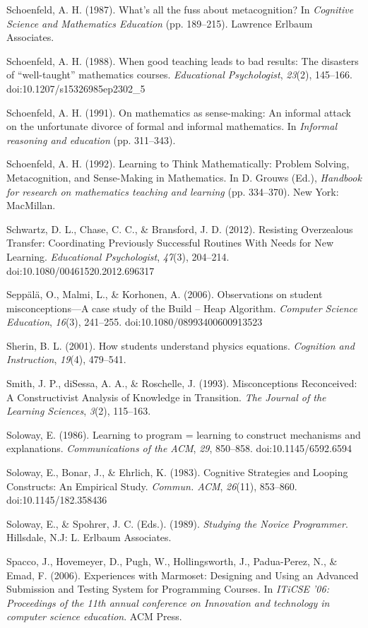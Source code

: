 Schoenfeld, A. H. (1987). What's all the fuss about metacognition? In
\emph{Cognitive Science and Mathematics Education} (pp. 189--215).
Lawrence Erlbaum Associates.

Schoenfeld, A. H. (1988). When good teaching leads to bad results: The
disasters of ``well-taught'' mathematics courses. \emph{Educational
Psychologist}, \emph{23}(2), 145--166. doi:10.1207/s15326985ep2302\_5

Schoenfeld, A. H. (1991). On mathematics as sense-making: An informal
attack on the unfortunate divorce of formal and informal mathematics. In
\emph{Informal reasoning and education} (pp. 311--343).

Schoenfeld, A. H. (1992). Learning to Think Mathematically: Problem
Solving, Metacognition, and Sense-Making in Mathematics. In D. Grouws
(Ed.), \emph{Handbook for research on mathematics teaching and learning}
(pp. 334--370). New York: MacMillan.

Schwartz, D. L., Chase, C. C., \& Bransford, J. D. (2012). Resisting
Overzealous Transfer: Coordinating Previously Successful Routines With
Needs for New Learning. \emph{Educational Psychologist}, \emph{47}(3),
204--214. doi:10.1080/00461520.2012.696317

Seppälä, O., Malmi, L., \& Korhonen, A. (2006). Observations on student
misconceptions---A case study of the Build -- Heap Algorithm.
\emph{Computer Science Education}, \emph{16}(3), 241--255.
doi:10.1080/08993400600913523

Sherin, B. L. (2001). How students understand physics equations.
\emph{Cognition and Instruction}, \emph{19}(4), 479--541.

Smith, J. P., diSessa, A. A., \& Roschelle, J. (1993). Misconceptions
Reconceived: A Constructivist Analysis of Knowledge in Transition.
\emph{The Journal of the Learning Sciences}, \emph{3}(2), 115--163.

Soloway, E. (1986). Learning to program = learning to construct
mechanisms and explanations. \emph{Communications of the ACM},
\emph{29}, 850--858. doi:10.1145/6592.6594

Soloway, E., Bonar, J., \& Ehrlich, K. (1983). Cognitive Strategies and
Looping Constructs: An Empirical Study. \emph{Commun. ACM},
\emph{26}(11), 853--860. doi:10.1145/182.358436

Soloway, E., \& Spohrer, J. C. (Eds.). (1989). \emph{Studying the Novice
Programmer}. Hillsdale, N.J: L. Erlbaum Associates.

Spacco, J., Hovemeyer, D., Pugh, W., Hollingsworth, J., Padua-Perez, N.,
\& Emad, F. (2006). Experiences with Marmoset: Designing and Using an
Advanced Submission and Testing System for Programming Courses. In
\emph{ITiCSE '06: Proceedings of the 11th annual conference on
Innovation and technology in computer science education}. ACM Press.

